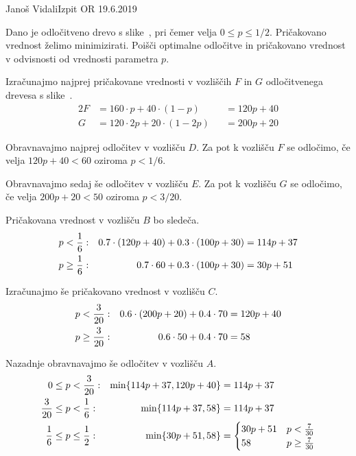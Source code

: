 \begin{naloga}{Janoš Vidali}{Izpit OR 19.6.2019}
\begin{vprasanje}
Dano je odločitveno drevo s slike~\fig,
pri čemer velja $0 \le p \le 1/2$.
Pričakovano vred\-nost želimo minimizirati.
Poišči optimalne odločitve in pričakovano vrednost
v odvisnosti od vrednosti parametra $p$.

\begin{slika}
\pgfslika
{}
\end{slika}
\end{vprasanje}

\begin{odgovor}
Izračunajmo najprej pričakovane vrednosti v vozliščih $F$ in $G$
odločitvenega drevesa s slike~\fig.
\begin{alignat*}{2}
F &= 160 \cdot p + 40 \cdot (1-p) &&= 120 p + 40 \\
G &= 120 \cdot 2p + 20 \cdot (1-2p) &&= 200 p + 20
\end{alignat*}

Obravnavajmo najprej odločitev v vozlišču $D$.
Za pot k vozlišču $F$ se odločimo,
če velja $120p + 40 < 60$ oziroma $p < 1/6$.

Obravnavajmo sedaj še odločitev v vozlišču $E$.
Za pot k vozlišču $G$ se odločimo,
če velja $200p + 20 < 50$ oziroma $p < 3/20$.

\needspace{\baselineskip}
Pričakovana vrednost v vozlišču $B$ bo sledeča.
\begin{align*}
p &< {1 \over 6}: & 0.7 \cdot (120p + 40) + 0.3 \cdot (100p + 30) &= 114p + 37
\\
p &\ge {1 \over 6}: & 0.7 \cdot 60 + 0.3 \cdot (100p + 30) &= 30p + 51
\end{align*}

Izračunajmo še pričakovano vrednost v vozlišču $C$.
\begin{align*}
p &< {3 \over 20}: & 0.6 \cdot (200p + 20) + 0.4 \cdot 70 &= 120p + 40
\\
p &\ge {3 \over 20}: & 0.6 \cdot 50 + 0.4 \cdot 70 &= 58
\end{align*}

Nazadnje obravnavajmo še odločitev v vozlišču $A$.
\begin{align*}
0 \le p &< {3 \over 20}: & \min \{ 114p + 37, 120p + 40 \} &= 114p + 37 \\
{3 \over 20} \le p &< {1 \over 6} : & \min \{ 114p + 37, 58 \} &= 114p + 37 \\
{1 \over 6} \le p &\le {1 \over 2} : & \min \{ 30p + 51, 58 \} &= \begin{cases}
30p + 51 & p < {7 \over 30} \\
58 & p \ge {7 \over 30}
\end{cases}
\end{align*}


\end{odgovor}
\end{naloga}
